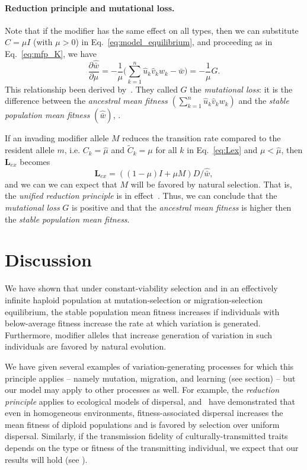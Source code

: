 \documentclass[9pt, a4paper, twocolumn]{extarticle}
\newcommand{\cl}{\mathbf{L}}
\begin{document}
\paragraph*{Reduction principle and mutational loss.}

Note that if the modifier has the same effect on all types,
then we can substitute $C = \mu I$ (with $\mu > 0$) in Eq.~\ref{eq:model_equilibrium}, and proceeding as in Eq.~\ref{eq:mfp_K}, we have
\begin{equation}\label{eq:mutational_loss}
\frac{\partial \hat{\bar{w}}}{\partial \mu} = 
-\frac{1}{\mu}\Big(\sum_{k=1}^{n} \hat u_k \hat v_k w_k - \hat{\bar{w}} \Big) = -\frac{1}{\mu} G.
\end{equation}
This relationship been derived by~\citet[eq.~24]{Hermisson2002}.
They called $G$ the \emph{mutational loss}: it is the difference between the \emph{ancestral mean fitness} $(\sum_{k=1}^{n} \hat u_k \hat v_k w_k)$ and the \emph{stable population mean fitness} $(\hat{\bar{w}})$, .

If an invading modifier allele $M$ reduces the transition rate compared to the resident allele $m$, i.e. $C_k = \hat \mu$ and $\tilde{C}_k = \mu$ for all $k$ in Eq.~\ref{eq:Lex} and $\mu < \hat \mu$, then $\cl_{ex}$ becomes
\begin{equation}
\cl_{ex} = ((1 - \mu)I + \mu M) D /\hat{\bar w},
\end{equation} 
and we can we can expect that $M$ will be favored by natural selection.
That is, the \emph{unified reduction principle} is in effect~\cite[eqs. 65, 72]{Altenberg2017}.
Thus, we can conclude that the \emph{mutational loss} $G$ is positive and that the \emph{ancestral mean fitness} is higher then the \emph{stable population mean fitness}.


\section*{Discussion}

We have shown that under constant-viability selection and in an effectively infinite haploid population at mutation-selection or migration-selection equilibrium, the stable population mean fitness increases if individuals with below-average fitness increase the rate at which variation is generated. Furthermore, modifier alleles that  increase generation of variation in such individuals are favored by natural evolution.

We have given several examples of variation-generating processes for which this principle applies -- namely mutation, migration, and learning (see \emph{} section) -- but our model may apply to other processes as well.
For example, the \emph{reduction principle} applies to ecological models of dispersal, and~\citet{Gueijman2013} have demonstrated that even in homogeneous environments, fitness-associated dispersal increases the mean fitness of diploid populations and is favored by selection over uniform dispersal.
Similarly, if the transmission fidelity of culturally-transmitted traits depends on the type or fitness of the transmitting individual, we expect that our results will hold (see ).
\end{document}
